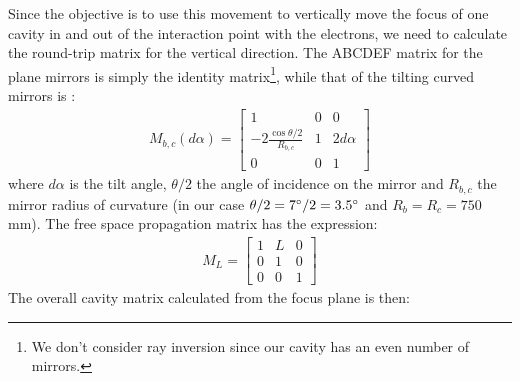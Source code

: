 Since the objective is to use this movement to vertically move the focus of one cavity in and out of the interaction point with the electrons, we need to calculate the round-trip matrix for the vertical direction. The ABCDEF matrix for the plane mirrors is simply the identity matrix\footnote{We don't consider ray inversion\parencite{siegman86,Plachenov2011} since our cavity has an even number of mirrors.}, while that of the tilting curved mirrors is :
\begin{align}
M_{b,c}(d\alpha) = 
\begin{bmatrix}
1 & 0 & 0\\
-2\frac{\cos\theta/2}{R_{b,c}} & 1 & 2d\alpha\\
0 & 0 & 1
\end{bmatrix}
\end{align} 
where $d\alpha$ is the tilt angle, $\theta/2$ the angle of incidence on the mirror and $R_{b,c}$ the mirror radius of curvature (in our case $\theta/2 = 7\degree /2 = 3.5\degree$ and $R_b=R_c=750$\,mm).
The free space propagation matrix has the expression:
\begin{align}
M_L = 
\begin{bmatrix}
1 & L & 0\\
0 & 1 & 0\\
0 & 0 & 1
\end{bmatrix}
\end{align}
The overall cavity matrix calculated from the focus plane is then:
